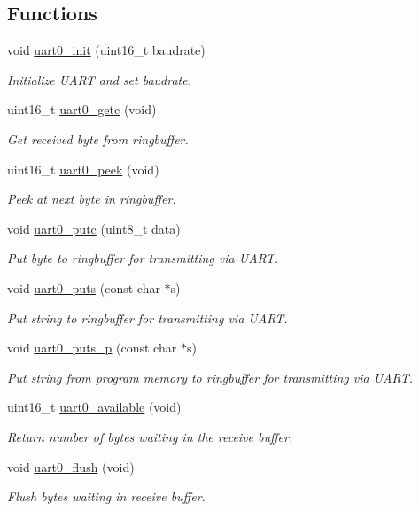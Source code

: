 \subsection*{Functions}
\begin{DoxyCompactItemize}
\item 
void \hyperlink{group__avr-uart_ga51de0a3b835652d285f354c078669e75}{uart0\+\_\+init} (uint16\+\_\+t baudrate)
\begin{DoxyCompactList}\small\item\em Initialize U\+A\+R\+T and set baudrate. \end{DoxyCompactList}\item 
uint16\+\_\+t \hyperlink{group__avr-uart_ga35407e8f77fa39c1a6b8504707b13dd2}{uart0\+\_\+getc} (void)
\begin{DoxyCompactList}\small\item\em Get received byte from ringbuffer. \end{DoxyCompactList}\item 
uint16\+\_\+t \hyperlink{group__avr-uart_ga7f0372a14af24f02f5c6615afd6671a0}{uart0\+\_\+peek} (void)
\begin{DoxyCompactList}\small\item\em Peek at next byte in ringbuffer. \end{DoxyCompactList}\item 
void \hyperlink{group__avr-uart_gaf52cb65e977992c01d1f2b7220243f94}{uart0\+\_\+putc} (uint8\+\_\+t data)
\begin{DoxyCompactList}\small\item\em Put byte to ringbuffer for transmitting via U\+A\+R\+T. \end{DoxyCompactList}\item 
void \hyperlink{group__avr-uart_gaeff5f5ff60334be95f0b895f96c10998}{uart0\+\_\+puts} (const char $\ast$s)
\begin{DoxyCompactList}\small\item\em Put string to ringbuffer for transmitting via U\+A\+R\+T. \end{DoxyCompactList}\item 
void \hyperlink{group__avr-uart_gad55b367ecb822ff1c172c78af6013fe5}{uart0\+\_\+puts\+\_\+p} (const char $\ast$s)
\begin{DoxyCompactList}\small\item\em Put string from program memory to ringbuffer for transmitting via U\+A\+R\+T. \end{DoxyCompactList}\item 
uint16\+\_\+t \hyperlink{group__avr-uart_gac369ee64442157556e517078029e9aab}{uart0\+\_\+available} (void)
\begin{DoxyCompactList}\small\item\em Return number of bytes waiting in the receive buffer. \end{DoxyCompactList}\item 
void \hyperlink{group__avr-uart_gab3e2b412a31f1d05a9a5be70f4b01109}{uart0\+\_\+flush} (void)
\begin{DoxyCompactList}\small\item\em Flush bytes waiting in receive buffer. \end{DoxyCompactList}\end{DoxyCompactItemize}


